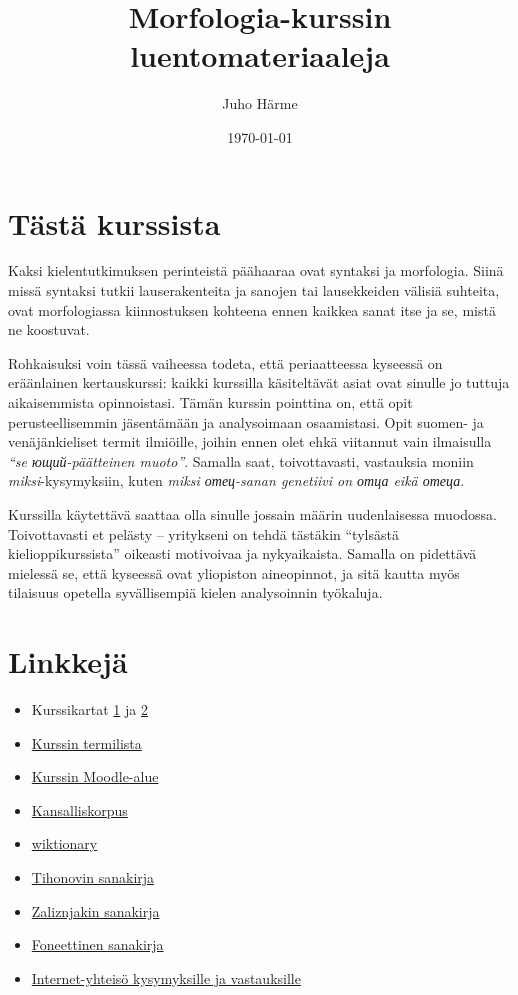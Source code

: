 \documentclass[]{scrartcl}
\author{Juho Härme}
\title{Morfologia-kurssin luentomateriaaleja}
\date{\today}
\providecommand{\tightlist}{%
  \setlength{\itemsep}{0pt}\setlength{\parskip}{0pt}}
\begin{document}
\maketitle
\tableofcontents
\newpage



\section{Tästä kurssista}\label{tuxe4stuxe4-kurssista}

Kaksi kielentutkimuksen perinteistä päähaaraa ovat syntaksi ja
morfologia. Siinä missä syntaksi tutkii lauserakenteita ja sanojen tai
lausekkeiden välisiä suhteita, ovat morfologiassa kiinnostuksen kohteena
ennen kaikkea sanat itse ja se, mistä ne koostuvat.

Rohkaisuksi voin tässä vaiheessa todeta, että periaatteessa kyseessä on
eräänlainen kertauskurssi: kaikki kurssilla käsiteltävät asiat ovat
sinulle jo tuttuja aikaisemmista opinnoistasi. Tämän kurssin pointtina
on, että opit perusteellisemmin jäsentämään ja analysoimaan osaamistasi.
Opit suomen- ja venäjänkieliset termit ilmiöille, joihin ennen olet ehkä
viitannut vain ilmaisulla \emph{``se ющий-päätteinen muoto''}. Samalla
saat, toivottavasti, vastauksia moniin \emph{miksi}-kysymyksiin, kuten
\emph{miksi отец-sanan genetiivi on отца eikä отеца}.

Kurssilla käytettävä saattaa olla sinulle jossain määrin uudenlaisessa
muodossa. Toivottavasti et pelästy -- yritykseni on tehdä tästäkin
``tylsästä kielioppikurssista'' oikeasti motivoivaa ja nykyaikaista.
Samalla on pidettävä mielessä se, että kyseessä ovat yliopiston
aineopinnot, ja sitä kautta myös tilaisuus opetella syvällisempiä kielen
analysoinnin työkaluja.

\section{Linkkejä}\label{linkkejuxe4}

\begin{itemize}
\tightlist
\item
  Kurssikartat
  \href{https://mustikka.uta.fi/~juho_harme/morfologia/materiaalit/kurssikartta1.pdf}{1}
  ja
  \href{https://mustikka.uta.fi/~juho_harme/morfologia/materiaalit/kurssikartta2.pdf}{2}
\item
  \href{termit.html}{Kurssin termilista}
\item
  \href{https://learning2.uta.fi/course/view.php?id=8679}{Kurssin
  Moodle-alue}
\item
  \href{http://www.ruscorpora.ru}{Kansalliskorpus}
\item
  \href{http://ru.wiktionary.org}{wiktionary}
\item
  \href{http://http://old.kpfu.ru/infres/slovar1}{Tihonovin sanakirja}
\item
  \href{http://morfologija.ru}{Zaliznjakin sanakirja}
\item
  \href{http://slovonline.ru/slovar_el_fonetic/}{Foneettinen sanakirja}
\item
  \href{http://rus.stackexchange.com/}{Internet-yhteisö kysymyksille ja
  vastauksille}
\end{itemize}
\end{document}
